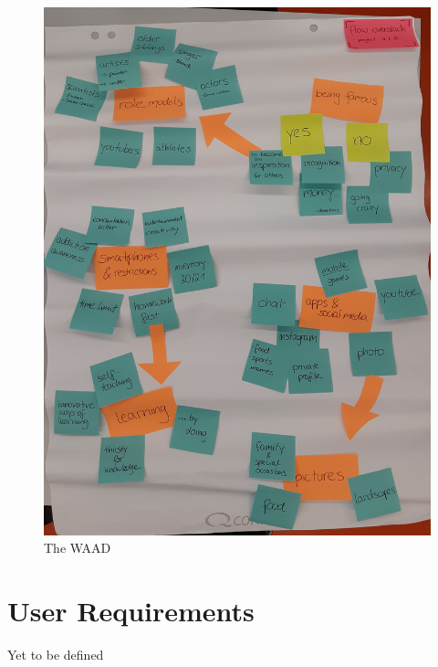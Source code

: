 \documentclass[12pt]{scrartcl}
\begin{document}
\begin{figure}[H]
	\centering
	\includegraphics[scale = 0.14]{WAAD.jpg}
	\caption{The WAAD}
	\label{WAAD}
\end{figure}

\section*{User Requirements}
	Yet to be defined
	
\end{document}
